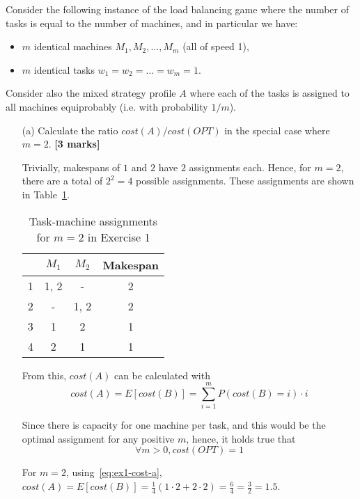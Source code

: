 
Consider the following instance of the load balancing game where the number of tasks is equal to the number of machines, and in particular we have:
\begin{itemize}
    \item $m$ identical machines $M_1, M_2, \dots, M_m$ (all of speed 1),
    \item $m$ identical tasks $w_1 = w_2 = \dots = w_m = 1$.
\end{itemize}
Consider also the mixed strategy profile $A$ where each of the tasks is assigned to all machines equiprobably (i.e. with probability $1/m$).
\begin{enumerate}
    \item[(a)] Calculate the ratio $cost(A)/cost(OPT)$ in the special case where $m=2$.  \hfill{\bf [3 marks]}\smallskip

    Trivially, makespans of $1$ and $2$ have $2$ assignments each.
    Hence, for $m = 2$, there are a total of $2^2 = 4$ possible assignments.
    These assignments are shown in Table~\ref{tab:ex1a}.

    \begin{table}[ht!]
        \centering
        \begin{tabular}{cccc}
          & $M_1$ & $M_2$ & Makespan \\ \hline
        1 & 1, 2  & -     & 2        \\
        2 & -     & 1, 2  & 2        \\
        3 & 1     & 2     & 1        \\
        4 & 2     & 1     & 1
        \end{tabular}
        \caption{Task-machine assignments for $m = 2$ in Exercise 1}
        \label{tab:ex1a}
    \end{table}

    From this, $cost(A)$ can be calculated with
    \begin{equation}
        cost(A) = E[cost(B)] = \sum_{i = 1}^{m} P(cost(B) = i) \cdot i
        \label{eq:ex1-cost-a}
    \end{equation}

    Since there is capacity for one machine per task, and this would be the optimal assignment for any positive $m$, hence, it holds true that
    \begin{equation}
        \forall{m} > 0, cost(OPT) = 1
        \label{eq:ex1-opt-cost}
    \end{equation}

    For $m = 2$, using~\eqref{eq:ex1-cost-a}, $cost(A) = E[cost(B)] = \frac{1}{4} (1 \cdot 2 + 2 \cdot 2) = \frac{6}{4} = \frac{3}{2} = 1.5$.


\end{enumerate}
